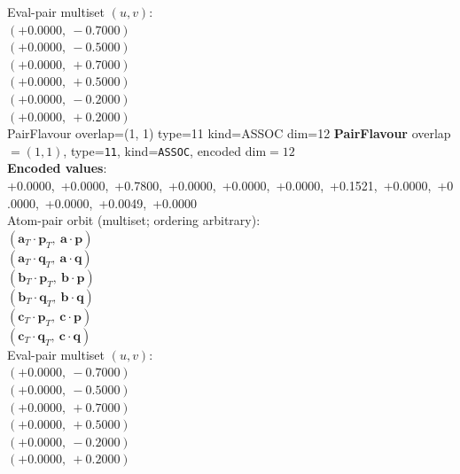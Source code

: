 \documentclass[a4paper,11pt]{article}
\newcommand{\pdcegfomjfhook}[2]{\mathbf{#1} \cdot \mathbf{#2}}
\newcommand{\fpbeomcfokjooi}[2]{\mathbf{#1}_T \cdot \mathbf{#2}_T}
\begin{document}
\quad Eval-pair multiset $(u, v)$:\\
$(+0.0000,\ -0.7000)$\\
$(+0.0000,\ -0.5000)$\\
$(+0.0000,\ +0.7000)$\\
$(+0.0000,\ +0.5000)$\\
$(+0.0000,\ -0.2000)$\\
$(+0.0000,\ +0.2000)$\\
    PairFlavour  overlap=(1, 1)  type=11  kind=ASSOC  dim=12
\textbf{PairFlavour} overlap$=(1, 1)$, type=\texttt{11}, kind=\texttt{ASSOC}, encoded dim$=12$\\
\textbf{      Encoded values}: +0.0000,\ +0.0000,\ +0.7800,\ +0.0000,\ +0.0000,\ +0.0000,\ +0.1521,\ +0.0000,\ +0.0000,\ +0.0000,\ +0.0049,\ +0.0000\\
\quad Atom-pair orbit (multiset; ordering arbitrary):\\
$(\fpbeomcfokjooi{a}{p},\ \pdcegfomjfhook{a}{p})$\\
$(\fpbeomcfokjooi{a}{q},\ \pdcegfomjfhook{a}{q})$\\
$(\fpbeomcfokjooi{b}{p},\ \pdcegfomjfhook{b}{p})$\\
$(\fpbeomcfokjooi{b}{q},\ \pdcegfomjfhook{b}{q})$\\
$(\fpbeomcfokjooi{c}{p},\ \pdcegfomjfhook{c}{p})$\\
$(\fpbeomcfokjooi{c}{q},\ \pdcegfomjfhook{c}{q})$\\
\quad Eval-pair multiset $(u, v)$:\\
$(+0.0000,\ -0.7000)$\\
$(+0.0000,\ -0.5000)$\\
$(+0.0000,\ +0.7000)$\\
$(+0.0000,\ +0.5000)$\\
$(+0.0000,\ -0.2000)$\\
$(+0.0000,\ +0.2000)$\\
\end{document}
